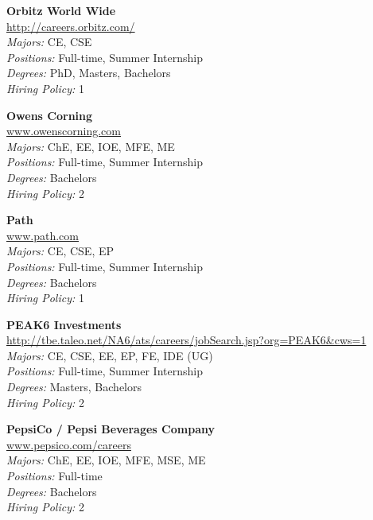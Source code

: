 \documentclass[twoside]{article}
\begin{document}
\begin{center}
\begin{multicols}{3}
\begin{minipage}{.9\columnwidth}{\Large\bf Orbitz World Wide }\\
	\url{http://careers.orbitz.com/}\\
	\emph{Majors:} CE, CSE\\
	\emph{Positions:} Full-time, Summer Internship\\
	\emph{Degrees:} PhD, Masters, Bachelors\\
	\emph{Hiring Policy:} 1\\
\end{minipage}
 
\begin{minipage}{.9\columnwidth}{\Large\bf Owens Corning }\\
	\url{www.owenscorning.com}\\
	\emph{Majors:} ChE, EE, IOE, MFE, ME\\
	\emph{Positions:} Full-time, Summer Internship\\
	\emph{Degrees:} Bachelors\\
	\emph{Hiring Policy:} 2\\
\end{minipage}
 
\begin{minipage}{.9\columnwidth}{\Large\bf Path }\\
	\url{www.path.com}\\
	\emph{Majors:} CE, CSE, EP\\
	\emph{Positions:} Full-time, Summer Internship\\
	\emph{Degrees:} Bachelors\\
	\emph{Hiring Policy:} 1\\
\end{minipage}
 
\begin{minipage}{.9\columnwidth}{\Large\bf PEAK6 Investments }\\
	\url{http://tbe.taleo.net/NA6/ats/careers/jobSearch.jsp?org=PEAK6&cws=1}\\
	\emph{Majors:} CE, CSE, EE, EP, FE, IDE (UG)\\
	\emph{Positions:} Full-time, Summer Internship\\
	\emph{Degrees:} Masters, Bachelors\\
	\emph{Hiring Policy:} 2\\
\end{minipage}
 
\begin{minipage}{.9\columnwidth}{\Large\bf PepsiCo / Pepsi Beverages Company }\\
	\url{www.pepsico.com/careers}\\
	\emph{Majors:} ChE, EE, IOE, MFE, MSE, ME\\
	\emph{Positions:} Full-time\\
	\emph{Degrees:} Bachelors\\
	\emph{Hiring Policy:} 2\\
\end{minipage}
 

\end{multicols}
\end{center}
\end{document}
